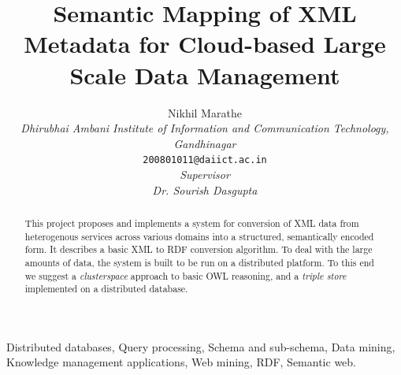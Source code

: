 \documentclass[journal]{IEEEtran}
\begin{document}
%
\title{Semantic Mapping of XML Metadata for Cloud-based Large Scale Data Management}
%
\author{Nikhil Marathe\\
    \emph{Dhirubhai Ambani Institute of Information and Communication Technology, Gandhinagar}\\
    \texttt{200801011@daiict.ac.in}\\
    \emph{Supervisor}\\
    \emph{Dr. Sourish Dasgupta}\\
}%
%

\maketitle
{}


\begin{abstract}
    This project proposes and implements a system for conversion of XML data
    from heterogenous services across various domains into a structured,
    semantically encoded form. It describes a basic XML to RDF conversion
    algorithm. To deal with the large amounts of data, the system is built to
    be run on a distributed platform. To this end we suggest
    a \emph{clusterspace} approach to basic OWL reasoning, and a \emph{triple
    store} implemented on a distributed database.
\end{abstract}

\begin{IEEEkeywords}
    Distributed databases, Query processing, Schema and sub-schema, Data
    mining, Knowledge management applications, Web mining, RDF, Semantic web.
\end{IEEEkeywords}
\end{document}
